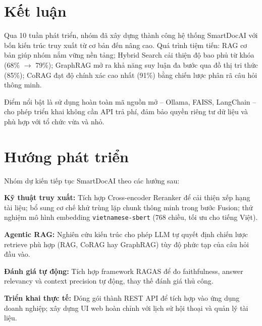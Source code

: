 \documentclass[10pt, conference, a4paper, compsocconf]{IEEEtran}
\begin{document}
\section{Kết luận}

Qua 10 tuần phát triển, nhóm đã xây dựng thành công hệ thống SmartDocAI
với bốn kiến trúc truy xuất từ cơ bản đến nâng cao. Quá trình tiệm tiến:
RAG cơ bản giúp nhóm nắm vững nền tảng; Hybrid Search cải thiện độ bao
phủ từ khóa (68\% $\to$ 79\%); GraphRAG mở ra khả năng suy luận đa bước
qua đồ thị tri thức (85\%); CoRAG đạt độ chính xác cao nhất (91\%) bằng
chiến lược phân rã câu hỏi thông minh.

Điểm nổi bật là sử dụng hoàn toàn mã nguồn mở -- Ollama, FAISS, LangChain
-- cho phép triển khai không cần API trả phí, đảm bảo quyền riêng tư dữ
liệu và phù hợp với tổ chức vừa và nhỏ.

\section{Hướng phát triển}

Nhóm dự kiến tiếp tục SmartDocAI theo các hướng sau:

\textbf{Kỹ thuật truy xuất:} Tích hợp Cross-encoder Reranker để cải thiện
xếp hạng tài liệu; bổ sung cơ chế khử trùng lặp chunk thông minh trong
bước Fusion; thử nghiệm mô hình embedding \texttt{vietnamese-sbert} (768
chiều, tối ưu cho tiếng Việt).

\textbf{Agentic RAG:} Nghiên cứu kiến trúc cho phép LLM tự quyết định
chiến lược retrieve phù hợp (RAG, CoRAG hay GraphRAG) tùy độ phức tạp của
câu hỏi đầu vào.

\textbf{Đánh giá tự động:} Tích hợp framework RAGAS để đo faithfulness,
answer relevancy và context precision tự động, thay thế đánh giá thủ công.

\textbf{Triển khai thực tế:} Đóng gói thành REST API để tích hợp vào ứng
dụng doanh nghiệp; xây dựng UI web hoàn chỉnh với lịch sử hội thoại và
quản lý tài liệu.

\end{document}
